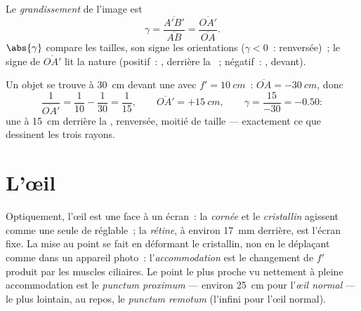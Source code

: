 \begin{definition}[Grandissement]\label{def:g11:lenses-and-eye:magnification}
Le \emph{grandissement} de l'image est
\[
\gamma = \frac{\overline{A'B'}}{\overline{AB}}
       = \frac{\overline{OA'}}{\overline{OA}} .
\]
$\abs{\gamma}$ compare les tailles, son signe les orientations
($\gamma < 0$~: renversée)~; le signe de $\overline{OA'}$ lit la nature
(positif~: , derrière la
~; négatif~: ,
devant).
\end{definition}

\begin{example}\label{ex:g11:lenses-and-eye:conjugate}
Un objet se trouve à \qty{30}{cm} devant une
 avec $f' = \qty{10}{cm}$~:
$\overline{OA} = \qty{-30}{cm}$, donc
\[
\frac{1}{\overline{OA'}} = \frac{1}{10} - \frac{1}{30} = \frac{1}{15},
\qquad \overline{OA'} = +\qty{15}{cm},
\qquad \gamma = \frac{15}{-30} = -0.50 :
\]
une  à \qty{15}{cm} derrière la
, renversée, moitié de taille --- exactement ce
que dessinent les trois rayons.
\end{example}

\section{L'œil}

\begin{definition}\label{def:g11:lenses-and-eye:eye}
Optiquement, l'œil est une  face à un
écran~: la \emph{cornée} et le
\emph{cristallin} agissent comme une seule
 de
 réglable~; la
\emph{rétine}, à environ \qty{17}{mm} derrière, est
l'écran fixe. La mise au point se fait en déformant le
cristallin, non en le déplaçant comme dans un appareil
photo~: l'\emph{accommodation} est le changement
de $f'$ produit par les muscles ciliaires. Le point le plus proche vu
nettement à pleine accommodation est le \emph{punctum
proximum} --- environ \qty{25}{cm} pour
l'\emph{œil normal} --- le plus lointain, au repos,
le \emph{punctum remotum} (l'infini pour l'œil
normal).
\end{definition}

